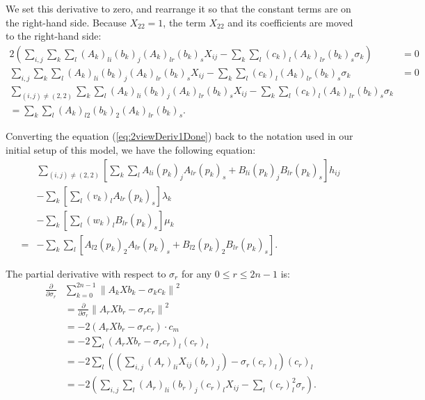 \documentclass[11pt, oneside, reqno]{book}
\begin{document}
We set this derivative to zero, and rearrange it so that the constant terms are on the right-hand side. Because $X_{22} = 1$, the term $X_{22}$ and its coefficients are moved to the right-hand side:
\begin{align}
 2\left( 
\sum_{i,j} \sum_{k}\sum_{l} \left(A_k\right)_{li} \left(b_k\right)_j \left(A_k\right)_{lr} \left(b_k\right)_s X_{ij} 
- \sum_k \sum_l \left(c_k\right)_l \left(A_k\right)_{lr} \left(b_k\right)_s \sigma_k 
\right) &= 0 \nonumber\\
 \sum_{i,j} \sum_k\sum_l \left(A_k\right)_{li} \left(b_k\right)_j \left(A_k\right)_{lr} \left(b_k\right)_s X_{ij} 
- \sum_k \sum_l \left(c_k\right)_l \left(A_k\right)_{lr} \left(b_k\right)_s \sigma_k &= 0 \nonumber\\
 \sum_{(i,j) \not= (2,2)} \sum_k\sum_l \left(A_k\right)_{li} \left(b_k\right)_j \left(A_k\right)_{lr} \left(b_k\right)_s X_{ij} 
- \sum_k \sum_l \left(c_k\right)_l \left(A_k\right)_{lr} \left(b_k\right)_s \sigma_k & \nonumber\\
 = \sum_k\sum_l \left(A_k\right)_{l2} \left(b_k\right)_2 \left(A_k\right)_{lr} \left(b_k\right)_s. \label{eq:2viewDeriv1Done}
\end{align}

Converting the equation (\ref{eq:2viewDeriv1Done}) back to the notation used in our initial setup of this model, we have the following equation:
\begin{align*}
&\sum_{(i,j) \not= (2,2)} 
\left[
\sum_k \sum_l A_{li}(p_k)_jA_{lr}(p_k)_s + B_{li}(p_k)_jB_{lr}(p_k)_s
\right] h_{ij} \\
&- \sum_k
\left[ 
\sum_l (v_k)_l A_{lr} (p_k)_s
\right] \lambda_k \\
&- \sum_k \left[
\sum_l (w_k)_l B_{lr} (p_k)_s
\right] \mu_k \\
= &- \sum_k \sum_l 
\left[
A_{l2}(p_k)_2 A_{lr} (p_k)_s +
B_{l2}(p_k)_2 B_{lr} (p_k)_s
\right].
\end{align*}


The partial derivative with respect to $\sigma_r$ for any $0 \le r \le 2n-1$ is:
\begin{align*}
\frac{\partial}{\partial \sigma_r} & \sum_{k=0}^{2n-1} \left\| A_k X b_k - \sigma_k c_k \right\|^2 \\
& = \frac{\partial}{\partial \sigma_r} \left\| A_r X b_r - \sigma_r c_r \right\|^2 \\
& = -2 \left(
A_r X b_r - \sigma_r c_r
\right)
\cdot c_m \\
& = -2 \sum_l \left(
A_r X b_r - \sigma_r c_r
\right)_l
\left(c_r\right)_l \\
& = -2 \sum_l \left(
\left(
\sum_{i,j} \left(A_r\right)_{li} X_{ij} \left(b_r\right)_j
\right)
- \sigma_r \left(c_r\right)_l
\right)
\left(c_r\right)_l \\
& = -2 \left(
\sum_{i,j} \sum_l
\left(A_r\right)_{li} \left(b_r\right)_j \left(c_r\right)_l X_{ij}
-
\sum_l 
\left(c_r\right)_l^2 \sigma_r
\right).
\end{align*}
\end{document}
